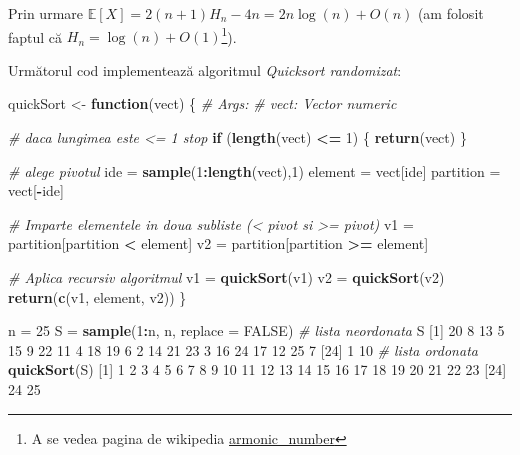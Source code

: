 \documentclass[]{article}
\newenvironment{Shaded}{\begin{snugshade}}{\end{snugshade}}
\newcommand{\KeywordTok}[1]{\textcolor[rgb]{0.13,0.29,0.53}{\textbf{#1}}}
\newcommand{\DataTypeTok}[1]{\textcolor[rgb]{0.13,0.29,0.53}{#1}}
\newcommand{\DecValTok}[1]{\textcolor[rgb]{0.00,0.00,0.81}{#1}}
\newcommand{\StringTok}[1]{\textcolor[rgb]{0.31,0.60,0.02}{#1}}
\newcommand{\CommentTok}[1]{\textcolor[rgb]{0.56,0.35,0.01}{\textit{#1}}}
\newcommand{\OtherTok}[1]{\textcolor[rgb]{0.56,0.35,0.01}{#1}}
\newcommand{\ControlFlowTok}[1]{\textcolor[rgb]{0.13,0.29,0.53}{\textbf{#1}}}
\newcommand{\OperatorTok}[1]{\textcolor[rgb]{0.81,0.36,0.00}{\textbf{#1}}}
\newcommand{\NormalTok}[1]{#1}
\let\rmarkdownfootnote\footnote%
\def\footnote{\protect\rmarkdownfootnote}
\begin{document}
Prin urmare \(\mathbb{E}[X] = 2(n+1)H_n - 4n = 2n\log(n) + O(n)\) (am
folosit faptul că \(H_n = \log(n)+O(1)\)\footnote{A se vedea pagina de
  wikipedia
  \href{https://en.wikipedia.org/wiki/Harmonic_number}{armonic\_number}}).

Următorul cod implementează algoritmul \emph{Quicksort randomizat}:

\begin{Shaded}
\begin{Highlighting}[]
\NormalTok{quickSort <-}\StringTok{ }\ControlFlowTok{function}\NormalTok{(vect) \{}
  \CommentTok{# Args:}
  \CommentTok{#  vect: Vector numeric}
  
  \CommentTok{# daca lungimea este <= 1 stop}
  \ControlFlowTok{if}\NormalTok{ (}\KeywordTok{length}\NormalTok{(vect) }\OperatorTok{<=}\StringTok{ }\DecValTok{1}\NormalTok{) \{}
    \KeywordTok{return}\NormalTok{(vect)}
\NormalTok{  \}}
  
  \CommentTok{# alege pivotul}
\NormalTok{  ide =}\StringTok{ }\KeywordTok{sample}\NormalTok{(}\DecValTok{1}\OperatorTok{:}\KeywordTok{length}\NormalTok{(vect),}\DecValTok{1}\NormalTok{)}
\NormalTok{  element =}\StringTok{ }\NormalTok{vect[ide]}
\NormalTok{  partition =}\StringTok{ }\NormalTok{vect[}\OperatorTok{-}\NormalTok{ide]}
  
  \CommentTok{# Imparte elementele in doua subliste (< pivot si >= pivot)}
\NormalTok{  v1 =}\StringTok{ }\NormalTok{partition[partition }\OperatorTok{<}\StringTok{ }\NormalTok{element]}
\NormalTok{  v2 =}\StringTok{ }\NormalTok{partition[partition }\OperatorTok{>=}\StringTok{ }\NormalTok{element]}
  
  \CommentTok{# Aplica recursiv algoritmul}
\NormalTok{  v1 =}\StringTok{ }\KeywordTok{quickSort}\NormalTok{(v1)}
\NormalTok{  v2 =}\StringTok{ }\KeywordTok{quickSort}\NormalTok{(v2)}
  \KeywordTok{return}\NormalTok{(}\KeywordTok{c}\NormalTok{(v1, element, v2))}
\NormalTok{\}}

\NormalTok{n =}\StringTok{ }\DecValTok{25}
\NormalTok{S =}\StringTok{ }\KeywordTok{sample}\NormalTok{(}\DecValTok{1}\OperatorTok{:}\NormalTok{n, n, }\DataTypeTok{replace =} \OtherTok{FALSE}\NormalTok{)}
\CommentTok{# lista neordonata}
\NormalTok{S}
\NormalTok{ [}\DecValTok{1}\NormalTok{] }\DecValTok{20}  \DecValTok{8} \DecValTok{13}  \DecValTok{5} \DecValTok{15}  \DecValTok{9} \DecValTok{22} \DecValTok{11}  \DecValTok{4} \DecValTok{18} \DecValTok{19}  \DecValTok{6}  \DecValTok{2} \DecValTok{14} \DecValTok{21} \DecValTok{23}  \DecValTok{3} \DecValTok{16} \DecValTok{24} \DecValTok{17} \DecValTok{12} \DecValTok{25}  \DecValTok{7}
\NormalTok{[}\DecValTok{24}\NormalTok{]  }\DecValTok{1} \DecValTok{10}
\CommentTok{# lista ordonata}
\KeywordTok{quickSort}\NormalTok{(S)}
\NormalTok{ [}\DecValTok{1}\NormalTok{]  }\DecValTok{1}  \DecValTok{2}  \DecValTok{3}  \DecValTok{4}  \DecValTok{5}  \DecValTok{6}  \DecValTok{7}  \DecValTok{8}  \DecValTok{9} \DecValTok{10} \DecValTok{11} \DecValTok{12} \DecValTok{13} \DecValTok{14} \DecValTok{15} \DecValTok{16} \DecValTok{17} \DecValTok{18} \DecValTok{19} \DecValTok{20} \DecValTok{21} \DecValTok{22} \DecValTok{23}
\NormalTok{[}\DecValTok{24}\NormalTok{] }\DecValTok{24} \DecValTok{25}
\end{Highlighting}
\end{Shaded}
\end{document}

